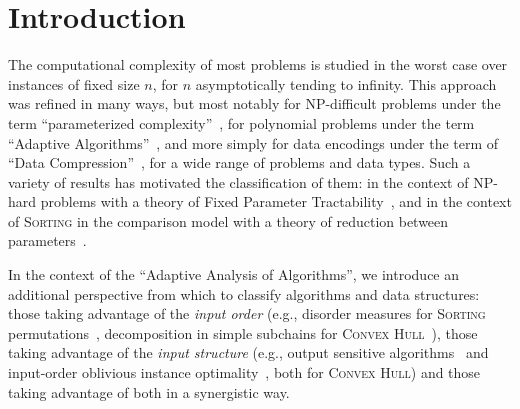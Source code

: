 \section{Introduction}
\label{sec:intro}


The computational complexity of most problems is studied in the worst
case over instances of fixed size $n$, for $n$ asymptotically tending
to infinity. This approach was refined in many ways, but most notably
for NP-difficult problems under the term ``parameterized
complexity''~\cite{2006-BOOK-ParameterizedComplexityTheory-FlumGrohe},
for polynomial problems under the term ``Adaptive
Algorithms''~\cite{1992-ACMCS-ASurveyOfAdaptiveSortingAlgorithms-EstivillCastroWood,1992-ACJ-AnOverviewOfAdaptiveSorting-MoffatPetersson},
and more simply for data encodings under the term of ``Data
Compression''~\cite{2013-TCS-OnCompressingPermutationsAndAdaptiveSorting-BarbayNavarro},
for a wide range of problems and data types.  Such a variety of
results has motivated the classification of them: in the
context of NP-hard problems with a theory of Fixed Parameter
Tractability~\cite{2006-BOOK-ParameterizedComplexityTheory-FlumGrohe},
and in the context of \textsc{Sorting} in the comparison model with a
theory of reduction between
parameters~\cite{1995-DAM-AFrameworkForAdaptiveSorting-PeterssonMoffat}.


In the context of the ``Adaptive Analysis of Algorithms'', we
introduce an additional perspective from which to classify algorithms
and data structures: those taking advantage of the \emph{input order}
(e.g., disorder measures for \textsc{Sorting}
permutations~\cite{1992-ACJ-AnOverviewOfAdaptiveSorting-MoffatPetersson,1992-ACMCS-ASurveyOfAdaptiveSortingAlgorithms-EstivillCastroWood},
decomposition in simple subchains for \textsc{Convex
  Hull}~\cite{2002-SWAT-AdaptiveAlgorithmsForConstructingConvexHullsAndTriangulationsOfPolygonalChains-LevcopoulosLingasMitchell}),
those taking advantage of the \emph{input structure} (e.g., output
sensitive
algorithms~\cite{1986-JCom-TheUltimatePlanarConvexHullAlgorithm-KirkpatrickSeidel}
and input-order oblivious instance
optimality~\cite{2009-FOCS-InstanceOptimalGeometricAlgorithms-AfshaniBarbayChan},
both for \textsc{Convex Hull}) and those taking advantage of both in a
synergistic way.

